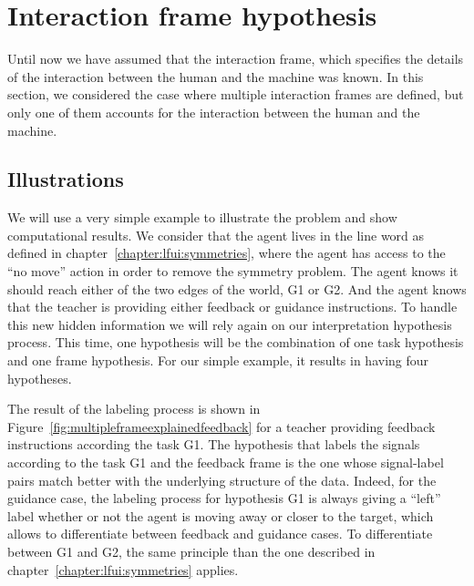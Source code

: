 
\section{Interaction frame hypothesis}
\label{chapter:limitations:framehypothesis}


Until now we have assumed that the interaction frame, which specifies the details of the interaction between the human and the machine was known. In this section, we considered the case where multiple interaction frames are defined, but only one of them accounts for the interaction between the human and the machine.


\subsection{Illustrations}

We will use a very simple example to illustrate the problem and show computational results. We consider that the agent lives in the line word as defined in chapter~\ref{chapter:lfui:symmetries}, where the agent has access to the ``no move'' action in order to remove the symmetry problem. The agent knows it should reach either of the two edges of the world, G1 or G2. And the agent knows that the teacher is providing either feedback or guidance instructions. To handle this new hidden information we will rely again on our interpretation hypothesis process. This time, one hypothesis will be the combination of one task hypothesis and one frame hypothesis. For our simple example, it results in having four hypotheses.

The result of the labeling process is shown in Figure~\ref{fig:multipleframeexplainedfeedback} for a teacher providing feedback instructions according the task G1. The hypothesis that labels the signals according to the task G1 and the feedback frame is the one whose signal-label pairs match better with the underlying structure of the data. Indeed, for the guidance case, the labeling process for hypothesis G1 is always giving a ``left'' label whether or not the agent is moving away or closer to the target, which allows to differentiate between feedback and guidance cases. To differentiate between G1 and G2, the same principle than the one described in chapter~\ref{chapter:lfui:symmetries} applies.

